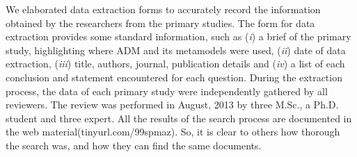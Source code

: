 

We elaborated data extraction forms to accurately record the information obtained by the researchers from the primary studies. The form for data extraction provides some standard information, such as (\textit{i}) a brief of the primary study, highlighting where ADM and its metamodels were used, (\textit{ii}) date of data extraction, (\textit{iii}) title, authors, journal, publication details and (\textit{iv}) a list of each conclusion and statement encountered for each question. During the extraction process, the data of each primary study were independently gathered by all reviewers. The review was performed in August, 2013 by three M.Sc., a Ph.D. student and three expert. All the results of the search process are documented in the web material(tinyurl.com/99spmaz). So, it is clear to others how thorough the search was, and how they can find the same documents.
